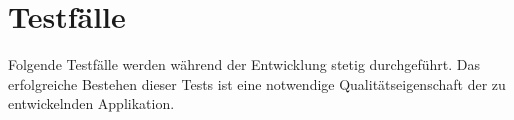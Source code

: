 \section{Testfälle}
Folgende Testfälle werden während der Entwicklung stetig durchgeführt. Das erfolgreiche Bestehen dieser Tests ist eine notwendige Qualitätseigenschaft der zu entwickelnden Applikation.
%
%
